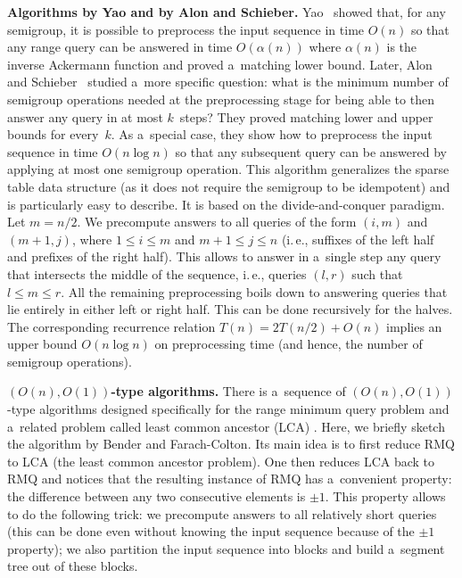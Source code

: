 \documentclass[11pt]{article}
\numberwithin{equation}{section}
\theoremstyle{definition}
\theoremstyle{plain}
\newcommand{\ie}{i.\,e.}
\theoremstyle{plain}\newtheorem{observation}[theorem]{Observation}
\begin{document}
\textbf{Algorithms by Yao and by Alon and Schieber.}
Yao~\cite{DBLP:conf/stoc/Yao82} showed that, for any semigroup, it is possible
to preprocess the input sequence in time $O(n)$ so that
%
%
%
any range query can be answered %
%
in time $O(\alpha(n))$ where $\alpha(n)$ is the inverse Ackermann function
and proved a~matching lower bound. Later, Alon and
Schieber~\cite{Alon87optimalpreprocessing} studied a~more specific question:
what is the minimum number of semigroup operations needed at the preprocessing
stage for being able to then answer any query in at most $k$~steps? They proved
matching lower and upper bounds for every~$k$. As a~special case, they show how
to preprocess the input sequence in time $O(n\log n)$ so that %
any subsequent query
can be answered %
by applying at most one semigroup operation. This algorithm
generalizes the sparse table data structure (as it does not require the
semigroup to be idempotent) and is particularly easy to describe. It is based on
the divide-and-conquer paradigm. Let $m=n/2$. We precompute answers to all
queries of the form $(i,m)$ and $(m+1,j)$, where $1 \le i \le m$ and
$m+1 \le j \le n$ (\ie, suffixes of the left half and prefixes of the right
half). This allows to answer in a~single step any query that intersects the
middle of the sequence, \ie, queries $(l,r)$ such that $l \le m \le r$. All the
remaining preprocessing boils down to answering queries that lie entirely in
either left or right half. This can be done recursively for the halves. The
corresponding recurrence relation $T(n)=2T(n/2)+O(n)$ implies an upper bound
$O(n\log n)$ on preprocessing time (and hence, the number of semigroup
operations).

\textbf{$(O(n), O(1))$-type algorithms.}
There is a~sequence of $(O(n), O(1))$-type algorithms designed specifically
%
for  %
the range minimum query problem and a~related problem called least common
ancestor (LCA) \cite{DBLP:journals/siamcomp/BerkmanV93,
    DBLP:journals/jal/BenderFPSS05,
    DBLP:conf/latin/BenderF00,
    DBLP:conf/cpm/FischerH06}. Here, we briefly sketch the algorithm by Bender and
Farach-Colton. Its main idea is to first reduce RMQ to LCA (the least common
ancestor problem). One then reduces LCA back to RMQ and notices that the
resulting instance of RMQ has a~convenient property: the difference between any
two consecutive elements is $\pm 1$. This property allows to do the following
trick: we precompute answers to all relatively short queries (this can be done
even without knowing the input sequence because of the $\pm 1$ property); we
also partition the input sequence into blocks and build a~segment tree out of
these blocks.
\end{document}
